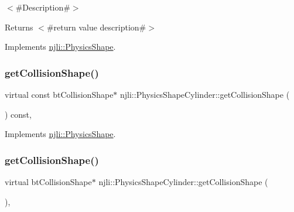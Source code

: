 $<$\#\+Description\#$>$

\begin{DoxyReturn}{Returns}
$<$\#return value description\#$>$ 
\end{DoxyReturn}


Implements \mbox{\hyperlink{classnjli_1_1_physics_shape_a72cb98a55614a3e264b8e4a157b45c64}{njli\+::\+Physics\+Shape}}.

\mbox{\label{classnjli_1_1_physics_shape_cylinder_aa3676c39e8377b6798b034b67ba07d31}} 
\subsubsection{\texorpdfstring{get\+Collision\+Shape()}{getCollisionShape()}\hspace{0.1cm}{\footnotesize\ttfamily [1/2]}}
{\footnotesize\ttfamily virtual const bt\+Collision\+Shape$\ast$ njli\+::\+Physics\+Shape\+Cylinder\+::get\+Collision\+Shape (\begin{DoxyParamCaption}{ }\end{DoxyParamCaption}) const\hspace{0.3cm}{\ttfamily [protected]}, {\ttfamily [virtual]}}



Implements \mbox{\hyperlink{classnjli_1_1_physics_shape_a527e956caca24bf16ed0d47f69ff14e8}{njli\+::\+Physics\+Shape}}.

\mbox{\label{classnjli_1_1_physics_shape_cylinder_a9a87d86c692a3b1ce42c68354f312440}} 
\subsubsection{\texorpdfstring{get\+Collision\+Shape()}{getCollisionShape()}\hspace{0.1cm}{\footnotesize\ttfamily [2/2]}}
{\footnotesize\ttfamily virtual bt\+Collision\+Shape$\ast$ njli\+::\+Physics\+Shape\+Cylinder\+::get\+Collision\+Shape (\begin{DoxyParamCaption}{ }\end{DoxyParamCaption})\hspace{0.3cm}{\ttfamily [protected]}, {\ttfamily [virtual]}}



